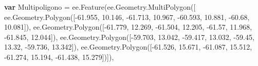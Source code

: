 \documentclass[
  12pt,
  letterpaper,
  twoside]{book}
\newenvironment{Shaded}{\begin{snugshade}}{\end{snugshade}}
\newcommand{\AttributeTok}[1]{\textcolor[rgb]{0.48,0.12,0.64}{#1}}
\newcommand{\ControlFlowTok}[1]{\textcolor[rgb]{0.00,0.00,0.00}{\textbf{#1}}}
\newcommand{\FloatTok}[1]{\textcolor[rgb]{0.28,0.53,0.93}{#1}}
\newcommand{\FunctionTok}[1]{\textcolor[rgb]{0.48,0.12,0.64}{#1}}
\newcommand{\KeywordTok}[1]{\textcolor[rgb]{0.48,0.12,0.64}{#1}}
\newcommand{\NormalTok}[1]{#1}
\newcommand{\OperatorTok}[1]{\textcolor[rgb]{0.00,0.00,0.00}{#1}}
\begin{document}
\begin{Shaded}
\begin{Highlighting}[]
\ControlFlowTok{var}\NormalTok{ Multipoligono }\OperatorTok{=} \KeywordTok{ee}\OperatorTok{.}\FunctionTok{Feature}\NormalTok{(}\KeywordTok{ee}\OperatorTok{.}\AttributeTok{Geometry}\OperatorTok{.}\FunctionTok{MultiPolygon}\NormalTok{([}
                \KeywordTok{ee}\OperatorTok{.}\AttributeTok{Geometry}\OperatorTok{.}\FunctionTok{Polygon}\NormalTok{([}\OperatorTok{{-}}\FloatTok{61.955}\OperatorTok{,} \FloatTok{10.146}\OperatorTok{,}         
                                       \OperatorTok{{-}}\FloatTok{61.713}\OperatorTok{,} \FloatTok{10.967}\OperatorTok{,}
                                       \OperatorTok{{-}}\FloatTok{60.593}\OperatorTok{,} \FloatTok{10.881}\OperatorTok{,}
                                           \OperatorTok{{-}}\FloatTok{60.68}\OperatorTok{,} \FloatTok{10.081}\NormalTok{])}\OperatorTok{,}
                            \KeywordTok{ee}\OperatorTok{.}\AttributeTok{Geometry}\OperatorTok{.}\FunctionTok{Polygon}\NormalTok{([}\OperatorTok{{-}}\FloatTok{61.779}\OperatorTok{,} \FloatTok{12.269}\OperatorTok{,}     
                                       \OperatorTok{{-}}\FloatTok{61.504}\OperatorTok{,} \FloatTok{12.205}\OperatorTok{,}
                                       \OperatorTok{{-}}\FloatTok{61.57}\OperatorTok{,} \FloatTok{11.968}\OperatorTok{,}
                                       \OperatorTok{{-}}\FloatTok{61.845}\OperatorTok{,} \FloatTok{12.044}\NormalTok{])}\OperatorTok{,}
                            \KeywordTok{ee}\OperatorTok{.}\AttributeTok{Geometry}\OperatorTok{.}\FunctionTok{Polygon}\NormalTok{([}\OperatorTok{{-}}\FloatTok{59.703}\OperatorTok{,} \FloatTok{13.042}\OperatorTok{,}         
                                       \OperatorTok{{-}}\FloatTok{59.417}\OperatorTok{,} \FloatTok{13.032}\OperatorTok{,}
                                       \OperatorTok{{-}}\FloatTok{59.45}\OperatorTok{,} \FloatTok{13.32}\OperatorTok{,}
                                       \OperatorTok{{-}}\FloatTok{59.736}\OperatorTok{,} \FloatTok{13.342}\NormalTok{])}\OperatorTok{,}
                            \KeywordTok{ee}\OperatorTok{.}\AttributeTok{Geometry}\OperatorTok{.}\FunctionTok{Polygon}\NormalTok{([}\OperatorTok{{-}}\FloatTok{61.526}\OperatorTok{,} \FloatTok{15.671}\OperatorTok{,}          
                                       \OperatorTok{{-}}\FloatTok{61.087}\OperatorTok{,} \FloatTok{15.512}\OperatorTok{,}
                                       \OperatorTok{{-}}\FloatTok{61.274}\OperatorTok{,} \FloatTok{15.194}\OperatorTok{,}
                                       \OperatorTok{{-}}\FloatTok{61.438}\OperatorTok{,} \FloatTok{15.279}\NormalTok{])])}\OperatorTok{,}

\end{Highlighting}
\end{Shaded}
\end{document}
